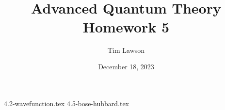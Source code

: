 \documentclass[a4paper]{extarticle}
\title{Advanced Quantum Theory\\
\large Homework 5}
\author{Tim Lawson}
\date{December 18, 2023}
\numberwithin{equation}{subsection}
\begin{document}
\maketitle

\setcounter{section}{4}
\setcounter{subsection}{1}
{4.2-wavefunction.tex}
\setcounter{subsection}{4}
{4.5-bose-hubbard.tex}
\end{document}
